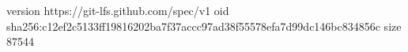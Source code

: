 version https://git-lfs.github.com/spec/v1
oid sha256:c12ef2c5133ff19816202ba7f37accc97ad38f55578efa7d99dc146bc834856c
size 87544
